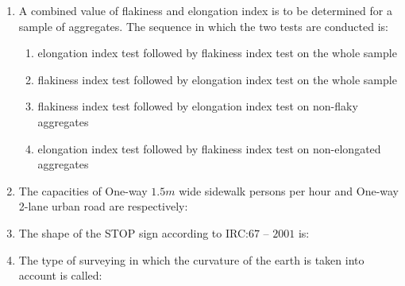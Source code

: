 \documentclass[journal]{IEEEtran}
\begin{document}
\begin{enumerate}
\item A combined value of flakiness and elongation index is to be determined for a sample of aggregates. The sequence in which the two tests are conducted is: \hfill {}

\begin{enumerate}
\item elongation index test followed by flakiness index test on the whole sample
\item flakiness index test followed by elongation index test on the whole sample
\item flakiness index test followed by elongation index test on non-flaky aggregates
\item elongation index test followed by flakiness index test on non-elongated aggregates
\end{enumerate}

\item The capacities of One-way $1.5 m$ wide sidewalk persons per hour and One-way 2-lane urban road  are respectively: \hfill {}
\begin{enumerate}
\end{enumerate}

\item The shape of the STOP sign according to IRC:$67$ -- $2001$ is: \hfill {}
\begin{enumerate}
\end{enumerate}

\item The type of surveying in which the curvature of the earth is taken into account is called: \hfill {}
\begin{enumerate}
\end{enumerate}


\end{enumerate}
\end{document}
